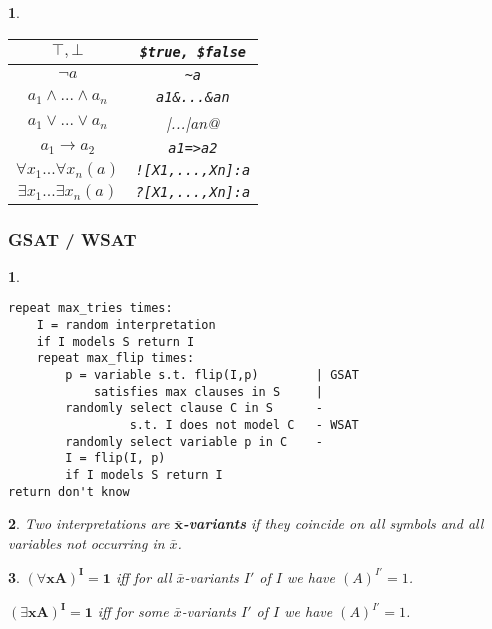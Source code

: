 \documentclass[9pt]{extarticle}
\theoremstyle{theoremstyle}
\newtheorem*{green}{}
\newtheorem*{red}{}
\begin{document}
\begin{multicols}{3}
\begin{minipage}[t]{.30\textwidth}
\begin{green}
	\begin{tabular}{c|c}
		$\top, \bot$ & \verb|$true, $false|\\
		\hline
		$\lnot a$ & \verb|~a|\\
		\hline
		$a_1 \land ... \land a_n$ & \verb|a1&...&an|\\
		\hline
		$a_1 \lor ... \lor a_n$ & \verb@a1|...|an@\\
		\hline
		$a_1 \rightarrow a_2$ & \verb|a1=>a2|\\
		\hline
		$\forall x_1 ... \forall x_n (a)$ & \verb|![X1,...,Xn]:a|\\
		\hline
		$\exists x_1 ... \exists x_n (a)$ & \verb|?[X1,...,Xn]:a|\\
	\end{tabular}
\end{green}

\end{minipage}\hfil

\begin{minipage}[t]{.30\textwidth}

\subsubsection*{GSAT / WSAT}
\begin{red}
\begin{verbatim}
repeat max_tries times:
    I = random interpretation
    if I models S return I
    repeat max_flip times:
        p = variable s.t. flip(I,p)        | GSAT
            satisfies max clauses in S     |
        randomly select clause C in S      -
                 s.t. I does not model C   - WSAT
        randomly select variable p in C    -
        I = flip(I, p)
        if I models S return I
return don't know	
\end{verbatim}
\end{red}

\begin{green}
Two interpretations are \textbf{$\mathbf{\bar{x}}$-variants} if they coincide on all symbols and all variables not occurring in $\bar{x}$.
\end{green}

\begin{green}
$\mathbf{(\forall x A)^I = 1}$ iff for all $\bar{x}$-variants $I'$ of $I$ we have $(A)^{I'} = 1$.

$\mathbf{(\exists x A)^I = 1}$ iff for some $\bar{x}$-variants $I'$ of $I$ we have $(A)^{I'} = 1$.
\end{green}


\end{minipage}
\end{multicols}
\end{document}
